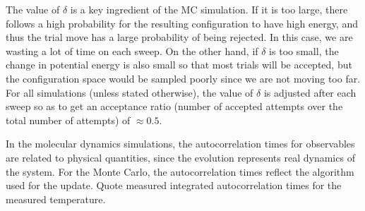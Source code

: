 The value of \(\delta\) is a key
ingredient of the MC simulation. If it is too large, there follows a high probability
for the resulting configuration to have high energy, and thus the trial move has a
large probability of being rejected.
In this case, we are wasting a lot of time on each sweep.
On the other hand, if \(\delta\) is too small, the change in
potential energy is also small so that most trials will be accepted, but the configuration
space would be sampled poorly since we are not moving too far.
For all simulations (unless stated otherwise), the
value of \(\delta\) is adjusted after each sweep so as to get an acceptance ratio (number of
accepted attempts over the total number of attempts) of \(\approx 0.5\).

\Question{}
In the molecular dynamics simulations, the autocorrelation times for observables are related
to physical quantities, since the evolution represents real dynamics of the system. For the
Monte Carlo, the autocorrelation times reflect the algorithm used for the update. Quote
measured integrated autocorrelation times for the measured temperature.

\Answer{}
